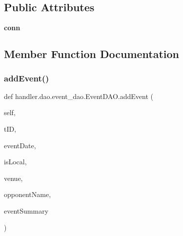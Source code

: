 \subsection*{Public Attributes}
\begin{DoxyCompactItemize}
\item 
\mbox{\label{classhandler_1_1dao_1_1event__dao_1_1_event_d_a_o_a18db499e8f41f67bb40bc8fbce49f187}} 
{\bfseries conn}
\end{DoxyCompactItemize}


\subsection{Member Function Documentation}
\mbox{\label{classhandler_1_1dao_1_1event__dao_1_1_event_d_a_o_a05ea963dea054f4258b89b6bcbf87945}} 
\subsubsection{\texorpdfstring{add\+Event()}{addEvent()}}
{\footnotesize\ttfamily def handler.\+dao.\+event\+\_\+dao.\+Event\+D\+A\+O.\+add\+Event (\begin{DoxyParamCaption}\item[{}]{self,  }\item[{}]{t\+ID,  }\item[{}]{event\+Date,  }\item[{}]{is\+Local,  }\item[{}]{venue,  }\item[{}]{opponent\+Name,  }\item[{}]{event\+Summary }\end{DoxyParamCaption})}

